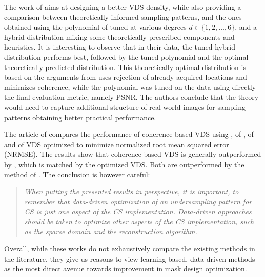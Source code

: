 The work of \citet{chauffert2013variable} aims at designing a better VDS density, while also providing a comparison between theoretically informed sampling patterns, and the ones obtained using the polynomial of  tuned at various degrees $d \in \{1,2,\ldots, 6\}$, and a hybrid distribution mixing some theoretically prescribed components and heuristics. It is interesting to observe that in their data, the tuned hybrid distribution performs best, followed by the tuned polynomial and the optimal theoretically predicted distribution. This theoretically optimal distribution is based on the arguments from \citet{rauhut2010compressive} uses rejection of already acquired locations \citep{puy2011variable} and minimizes coherence, while the polynomial was tuned on the data using directly the final evaluation metric, namely PSNR. The authors conclude that the theory would need to capture additional structure of real-world images for sampling patterns obtaining better practical performance. 

The article of \citet{zijlstra2016evaluation} compares the performance of coherence-based VDS using , of \citet{knoll2011adapted}, of \citet{liu2012under} and of VDS optimized to minimize normalized root mean squared error (NRMSE). The results show that coherence-based VDS is generally outperformed by \citet{knoll2011adapted}, which is matched by the optimized VDS. Both are outperformed by the method of \citet{liu2012under}. The conclusion is however careful: \blockquote{\textit{When putting the presented results in perspective, it is important, to remember that data-driven optimization of an undersampling pattern for CS is just one aspect of the CS implementation. Data-driven approaches should be taken to optimize other aspects of the CS implementation, such as the sparse domain and the reconstruction algorithm.}}

Overall, while these works do not exhaustively compare the existing methods in the literature, they give us reasons to view learning-based, data-driven methods as the most direct avenue towards improvement in mask design optimization. 




